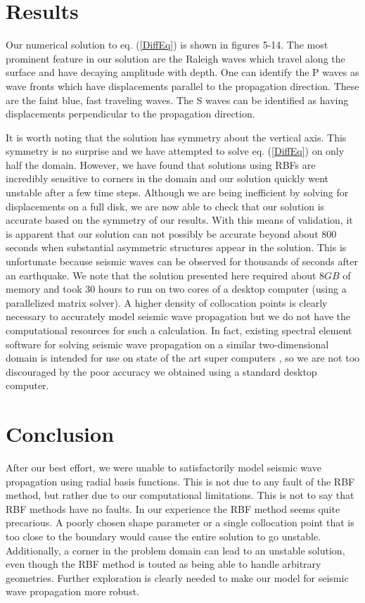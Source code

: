 \documentclass[12pt]{article}
\begin{document}
\section*{Results}
Our numerical solution to eq. (\ref{DiffEq}) is shown in figures 5-14.
The most prominent feature in our solution are the Raleigh waves which
travel along the surface and have decaying amplitude with depth.  One
can identify the P waves as wave fronts which have displacements
parallel to the propagation direction.  These are the faint blue, fast
traveling waves.  The S waves can be identified as having displacements
perpendicular to the propagation direction.  

It is worth noting that the solution has symmetry about the vertical
axis.  This symmetry is no surprise and we have attempted to solve
eq. (\ref{DiffEq}) on only half the domain.  However, we have found
that solutions using RBFs are incredibly sensitive to corners in the
domain and our solution quickly went unstable after a few time steps.
Although we are being inefficient by solving for displacements on a
full disk, we are now able to check that our solution is accurate
based on the symmetry of our results.  With this means of validation,
it is apparent that our solution can not possibly be accurate beyond
about 800 seconds when substantial asymmetric structures appear in the
solution. This is unfortunate because seismic waves can be observed
for thousands of seconds after an earthquake.  We note that the
solution presented here required about $8 GB$ of memory and took 30
hours to run on two cores of a desktop computer (using a parallelized
matrix solver).  A higher density of collocation points is clearly
necessary to accurately model seismic wave propagation but we do not
have the computational resources for such a calculation.  In fact,
existing spectral element software for solving seismic wave
propagation on a similar two-dimensional domain is intended for use on
state of the art super computers \citep[e.g.][]{N2007}, so we are not
too discouraged by the poor accuracy we obtained using a standard
desktop computer.

\section*{Conclusion}
After our best effort, we were unable to satisfactorily model
seismic wave propagation using radial basis functions.  This is not
due to any fault of the RBF method, but rather due to our
computational limitations.  This is not to say that RBF methods have
no faults.  In our experience the RBF method seems quite precarious.
A poorly chosen shape parameter or a single collocation point that is
too close to the boundary would cause the entire solution to go
unstable.  Additionally, a corner in the problem domain can lead to an
unstable solution, even though the RBF method is touted as being able
to handle arbitrary geometries.  Further exploration is clearly needed
to make our model for seismic wave propagation more robust.
\end{document}
